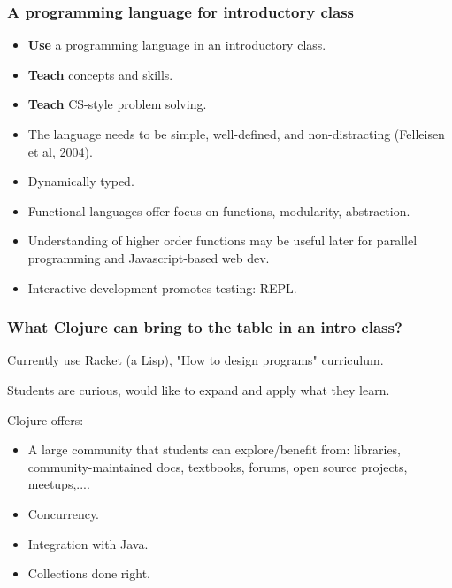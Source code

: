 \documentclass{beamer}
\begin{document}
\begin{frame}
   \frametitle{A programming language for introductory class}
\begin{itemize}
\item {\bf Use} a programming language in an introductory class.
\item <2->{\bf  Teach} concepts and skills.
\item <3-> {\bf  Teach} CS-style problem solving.
\item <4->The language needs to be simple, well-defined, and non-distracting (Felleisen et al, 2004).
\item <5->Dynamically typed.
\item <6-> Functional languages offer focus on functions, modularity, abstraction.
\item <7-> Understanding of higher order functions may be useful later for parallel programming and Javascript-based web dev. 
\item <8-> Interactive development promotes testing: REPL. 
\end{itemize}
\end{frame}

\begin{frame}
   \frametitle{What Clojure can bring to the table in an intro class?}
Currently use Racket (a Lisp), "How to design programs" curriculum.

Students are curious, would like to expand and apply what they learn. 

Clojure offers:
\begin{itemize}
\item A large community that students can explore/benefit from: libraries, community-maintained docs, textbooks, forums, open source projects, meetups,....
\item Concurrency.
\item Integration with Java. 
\item Collections done right. 
\end{itemize}
\end{frame}

\end{document}

